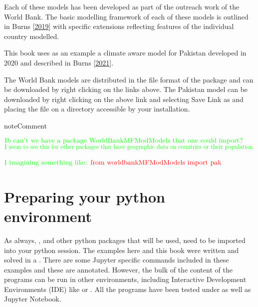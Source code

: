 \documentclass[letterpaper,10pt,english]{jupyterBook}
\begin{document}
\sphinxAtStartPar
Each of these models has been developed as part of the outreach work of the World Bank.  The basic modelling framework of each of these models is outlined in Burns  {[}\hyperlink{cite.content/99_BackMatter/References:id27}{2019}{]} with specific extensions reflecting features of the individual country modelled.

\sphinxAtStartPar
This book uses as an example a climate aware model for Pakistan developed in 2020 and described in Burns  {[}\hyperlink{cite.content/99_BackMatter/References:id14}{2021}{]}.

\sphinxAtStartPar
The World Bank models are distributed in the  file format of the  package and can be downloaded by right clicking on the links above.  The Pakistan model can be downloaded  by right clicking on the above link and selecting Save Link as and placing the file on a directory accessible by your  installation.

\begin{sphinxadmonition}{note}{Comment}

\sphinxAtStartPar
\(\color{green}{\text{Ib can't we have a package WorldBankMFModModels that one could import?}}\)
\(\color{green}{\text{I seem to see this for other packages that have geographic data on countries or their population.}}\)

\sphinxAtStartPar
\(\color{green}{\text{I imagining something like:}}\)
\(\color{red}{\text{from worldbankMFModModels import pak}}\)
\end{sphinxadmonition}


\section{Preparing your python environment}
\label{\detokenize{content/05_WBModels/LoadingWBModel:preparing-your-python-environment}}
\sphinxAtStartPar
As always, , and other python packages that will be used, need to be imported into your python session.  The examples here and this book were written and solved in a . There are some Jupyter specific commands included in these examples and these are annotated. However, the bulk of the content of the programs can be run in other environments, including Interactive Development Environments (IDE) like or .  All the programs have been tested under  as well as Jupyter Notebook.
\end{document}
